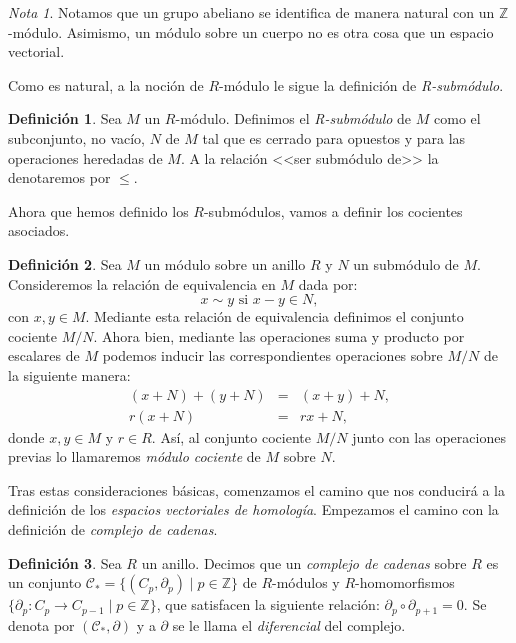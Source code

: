 \documentclass[12pt, a4paper, twoside]{book}
\numberwithin{equation}{section}
\theoremstyle{definition}
\newtheorem{defi}{Definición}[section]
\theoremstyle{remark}
\newtheorem*{remark}{Nota}
\theoremstyle{plain}
\begin{document}
	\begin{remark}
		Notamos que un grupo abeliano se identifica de manera natural 
		con un $\mathbb{Z}$-módulo. Asimismo, un módulo sobre un 
		cuerpo no es otra cosa que un espacio vectorial. 	
	\end{remark}

	Como es natural, a la noción de $R$-módulo le sigue la definición de
	\emph{R-submódulo}.

	\begin{defi}
	Sea $M$ un $R$-módulo. Definimos el \textit{R-submódulo} de $M$ como 
	el subconjunto, no vacío, $N$ de $M$ tal que es cerrado para opuestos 
	y para las operaciones heredadas de $M$. A la relación <<ser submódulo 
	de>> la denotaremos por $\leq$.
	\end{defi}

	Ahora que hemos definido los $R$-submódulos, vamos a definir los 
	cocientes asociados.

	\begin{defi}
		Sea $M$ un módulo sobre un anillo $R$ y $N$ un submódulo de 
		$M$. Consideremos la relación de equivalencia en $M$ dada por:
		$$
		x \sim y \text{ si } x-y \in N,
		$$
		con $x,y \in M$. Mediante esta relación de equivalencia 
		definimos el conjunto cociente $M/N$. Ahora bien, mediante las 
		operaciones suma y producto por escalares de $M$ podemos 
		inducir las correspondientes operaciones sobre $M/N$ de la 
		siguiente manera:
		\begin{equation*}
		\begin{array}{rll}
			(x+N)+(y+N) & = & (x+y)+N,\\
			r(x+N) & = & rx+N,
		\end{array}
		\end{equation*}
		donde $x,y \in M$ y $r \in R$. Así, al conjunto cociente 
		$M/N$ junto con las operaciones previas lo llamaremos 
		\textit{módulo cociente} de $M$ sobre $N$.
	\end{defi}

	Tras estas consideraciones básicas, comenzamos el camino que nos 
	conducirá a la definición de los \emph{espacios vectoriales de 
	homología}. Empezamos el camino con la definición de \emph{complejo de 
	cadenas}.

	\begin{defi}
	\label{def:complejo-cadenas}
	Sea $R$ un anillo. Decimos que un \textit{complejo de cadenas} sobre 
	$R$ 
	es un conjunto $\mathcal{C}_{*}=\{(C_{p},\partial_{p}) \mid p \in 
	\mathbb{Z}\}$
	de $R$-módulos y $R$-homomorfismos $\{\partial_{p}\colon C_{p} 
		\rightarrow 
	C_{p-1} \mid p \in \mathbb{Z}\}$, que satisfacen la siguiente 
	relación: $\partial_{p}\circ 
	\partial_{p+1}=0$. Se denota por $(\mathcal{C}_{*},\partial)$ y a 
	$\partial$ se le llama el \textit{diferencial} del complejo.
	\end{defi}
\end{document}
